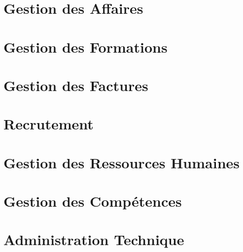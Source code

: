 \documentclass[12pt]{scrreprt}
\begin{document}
\chapter{Gestion des Affaires}


\chapter{Gestion des Formations}


\chapter{Gestion des Factures}

\chapter{Recrutement}


\chapter{Gestion des Ressources Humaines}

\chapter{Gestion des Compétences}


\chapter{Administration Technique}

\end{document}
